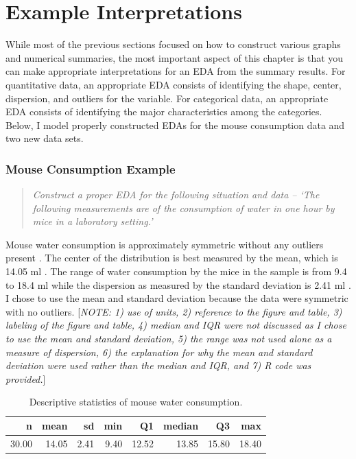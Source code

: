 \documentclass[10pt,openany]{book}\usepackage[]{graphicx}\usepackage[]{color}
\begin{document}
\section{Example Interpretations}
\vspace{-12pt}
While most of the previous sections focused on how to construct various graphs and numerical summaries, the most important aspect of this chapter is that you can make appropriate interpretations for an EDA from the summary results.  For quantitative data, an appropriate EDA consists of identifying the shape, center, dispersion, and outliers for the variable.  For categorical data, an appropriate EDA consists of identifying the major characteristics among the categories.  Below, I model properly constructed EDAs for the mouse consumption data and two new data sets.

\subsubsection{Mouse Consumption Example}
\vspace{-12pt}
\begin{quote}
\textit{Construct a proper EDA for the following situation and data -- `The  following measurements  are of the consumption of water in one hour by mice in a laboratory setting.'}
\end{quote}
\vspace{-12pt}


Mouse water consumption is approximately symmetric without any outliers present .  The center of the distribution is best measured by the mean, which is 14.05 ml .  The range of water consumption by the mice in the sample is from 9.4 to 18.4 ml while the dispersion as measured by the standard deviation is 2.41 ml .  I chose to use the mean and standard deviation because the data were symmetric with no outliers.  [\textit{NOTE: 1) use of units, 2) reference to the figure and table, 3) labeling of the figure and table, 4) median and IQR were not discussed as I chose to use the mean and standard deviation, 5) the range was not used alone as a measure of dispersion, 6) the explanation for why the mean and standard deviation were used rather than the median and IQR, and 7) R code was provided.}]

\begin{table}[ht]
\centering
\caption{Descriptive statistics of mouse water consumption.} 
\label{tab:MouseStats}
\begin{tabular}{rrrrrrrr}
  \hline
n & mean & sd & min & Q1 & median & Q3 & max \\ 
  \hline
30.00 & 14.05 & 2.41 & 9.40 & 12.52 & 13.85 & 15.80 & 18.40 \\ 
   \hline
\end{tabular}
\end{table}
\end{document}
